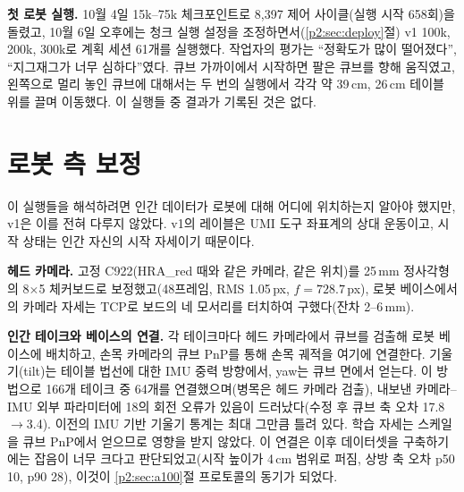 \documentclass[conference,10pt]{IEEEtran}
\newcommand{\mm}{\,mm\xspace}
\begin{document}
\begin{table}[t]
\centering\footnotesize\setlength{\tabcolsep}{3pt}
\caption{체크포인트별 held-out 손실(지도되는 9차원에 대한 마스킹된 MSE). 괄호 안은 학습 부분집합 손실.}
\label{p2:tab:val}
\end{table}

\textbf{첫 로봇 실행.} 10월 4일 15k--75k 체크포인트로 8{,}397 제어 사이클(실행 시작 658회)을 돌렸고, 10월 6일 오후에는
청크 실행 설정을 조정하면서(\ref{p2:sec:deploy}절) v1 100k, 200k, 300k로 계획 세션 61개를 실행했다. 작업자의 평가는
“정확도가 많이 떨어졌다”, “지그재그가 너무 심하다”였다. 큐브 가까이에서 시작하면 팔은 큐브를 향해 움직였고, 왼쪽으로 멀리
놓인 큐브에 대해서는 두 번의 실행에서 각각 약 39\,cm, 26\,cm 테이블 위를 끌며 이동했다. 이 실행들 중 결과가 기록된 것은
없다.

\section{로봇 측 보정}\label{p2:sec:robotcal}
이 실행들을 해석하려면 인간 데이터가 로봇에 대해 어디에 위치하는지 알아야 했지만, v1은 이를 전혀 다루지 않았다. v1의
레이블은 UMI 도구 좌표계의 상대 운동이고, 시작 상태는 인간 자신의 시작 자세이기 때문이다.

\textbf{헤드 카메라.} 고정 C922(HRA\_red 때와 같은 카메라, 같은 위치)를 25\mm 정사각형의 8$\times$5 체커보드로
보정했고(48프레임, RMS 1.05\,px, $f=728.7$\,px), 로봇 베이스에서의 카메라 자세는 TCP로 보드의 네 모서리를 터치하여
구했다(잔차 2--6\mm).

\textbf{인간 테이크와 베이스의 연결.} 각 테이크마다 헤드 카메라에서 큐브를 검출해 로봇 베이스에 배치하고, 손목 카메라의
큐브 PnP를 통해 손목 궤적을 여기에 연결한다. 기울기(tilt)는 테이블 법선에 대한 IMU 중력 방향에서, yaw는 큐브 면에서
얻는다. 이 방법으로 166개 테이크 중 64개를 연결했으며(병목은 헤드 카메라 검출), 내보낸 카메라--IMU 외부 파라미터에
18\textdegree{}의 회전 오류가 있음이 드러났다(수정 후 큐브 축 오차 17.8$\to$3.4\textdegree). 이전의 IMU 기반 기울기
통계는 최대 그만큼 틀려 있다. 학습 자세는 스케일을 큐브 PnP에서 얻으므로 영향을 받지 않았다. 이 연결은 이후 데이터셋을
구축하기에는 잡음이 너무 크다고 판단되었고(시작 높이가 4\,cm 범위로 퍼짐, 상방 축 오차 p50 10\textdegree, p90
28\textdegree), 이것이 \ref{p2:sec:a100}절 프로토콜의 동기가 되었다.
\end{document}

